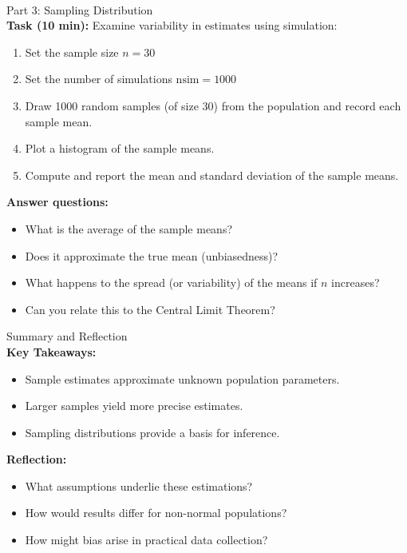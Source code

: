 \documentclass[main.tex]{subfiles}
\begin{document}
\begin{frame}
\begin{block}{\\Part 3: Sampling Distribution\\}
\textbf{Task (10 min):} Examine variability in estimates using simulation:
\begin{enumerate}
\small
  \item Set the sample size $n=30$
  \item Set the number of simulations $\text{nsim} = 1000$
  \item Draw 1000 random samples (of size 30) from the population and record each sample mean.
  \item Plot a histogram of the sample means.
    \item Compute and report the mean and standard deviation of the sample means.
\end{enumerate}
\textbf{Answer questions:}
\begin{itemize}
\small
  \item What is the average of the sample means?
  \item Does it approximate the true mean (unbiasedness)?
  \item What happens to the spread (or variability) of the means if $n$ increases?
  \item Can you relate this to the Central Limit Theorem?
\end{itemize}
\end{block}
\end{frame}


\begin{frame}
\begin{block}{Summary and Reflection\\}
\textbf{Key Takeaways:}
\begin{itemize}
  \item Sample estimates approximate unknown population parameters.
  \item Larger samples yield more precise estimates.
  \item Sampling distributions provide a basis for inference.
\end{itemize}

\textbf{Reflection:}
\begin{itemize}
  \item What assumptions underlie these estimations?
  \item How would results differ for non-normal populations?
  \item How might bias arise in practical data collection?
\end{itemize}
\end{block}
\end{frame}
\end{document}
